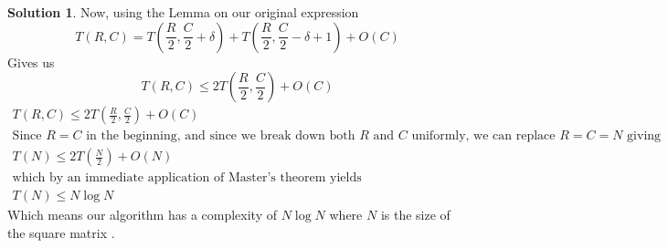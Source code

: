 \documentclass{article}
\theoremstyle{definition}
\newtheorem*{solution}{Solution}
\begin{document}
\begin{solution}
Now, using the Lemma on our original expression
$$
T(R, C) = T\left(\frac{R}{2}, \frac{C}{2} + \delta\right) + T\left(\frac{R}{2}, \frac{C}{2} - \delta + 1 \right) + O(C)
$$
Gives us
$$
T(R, C) \leq 2 T \left(\frac{R}{2}, \frac{C}{2} \right) + O(C)
$$
\begin{gather*}
T(R, C) \leq 2 T \left(\frac{R}{2}, \frac{C}{2} \right) + O(C) \\
\text{Since $R = C$ in the beginning, and since we break down both $R$ and $C$ uniformly, we can replace $R = C = N$ giving} \\
T(N) \leq  2 T \left( \frac{N}{2} \right) + O(N) \\
\text{which by an immediate application of Master's theorem yields} \\
T(N) \leq N \log N
\end{gather*}
Which means our algorithm has a complexity of $N \log N$ where $N$ is the size of the square matrix .
\end{solution}
\end{document}
